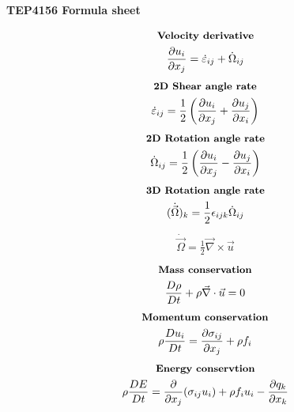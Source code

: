 \documentclass[10pt, a4paper]{article}
\newcommand{\derivative}[2]{\frac{\partial #1}{\partial #2}}
\begin{document}
\begin{center}
    \Large
    \textbf{TEP4156 Formula sheet}
    \vspace{0.5cm}
\end{center}

\begin{multicols*}{2}
    \begin{gather*}
        \textbf{\small Velocity derivative} \\
        \derivative{ u_i}{x_j} = \dot{\varepsilon}_{ij} + \dot{\Omega}_{ij}
    \end{gather*}
    \begin{gather*}
        \textbf{\small 2D Shear angle rate} \\
        \dot{\varepsilon}_{ij} = \frac12\left( \derivative{ u_i}{x_j} +
        \derivative{ u_j}{x_i}\right)
    \end{gather*}
    \begin{gather*}
        \textbf{\small 2D Rotation angle rate} \\
        \dot{\Omega}_{ij} = \frac12\left( \derivative{ u_i}{x_j} -
        \derivative{ u_j}{x_i}\right)
    \end{gather*}
    \begin{gather*}
        \textbf{\small 3D Rotation angle rate} \\
        (\dot{\vec{\Omega}})_k = \frac12 \epsilon_{ijk}\dot{\Omega}_{ij}
    \end{gather*}
    \begin{gather*}
        \dot{\vec{\Omega}} = \frac12 \vec{\nabla}\times\vec{u}
    \end{gather*}
    \begin{gather*}
        \textbf{\small Mass conservation} \\
        \frac{D\rho}{Dt} + \rho \vec{\nabla} \cdot \vec{u} = 0
    \end{gather*}
    \begin{gather*}
        \textbf{\small Momentum conservation} \\
        \rho \frac{Du_i}{Dt} = \derivative{ \sigma_{ij}}{x_j} + \rho f_i
    \end{gather*}
    \begin{gather*}
        \textbf{\small Energy conservtion} \\
        \rho \frac{DE}{Dt} = \derivative{}{x_j}(\sigma_{ij} u_i) + \rho f_i u_i - \derivative{ q_k}{x_k}
    \end{gather*}
    \begin{gather*}

\end{gather*}
\end{multicols*}
\end{document}
